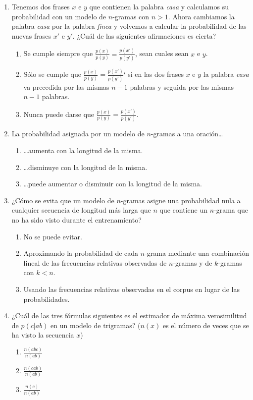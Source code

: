 \documentclass[12pt,a4paper]{article}
\begin{document}
\begin{enumerate}
\item Tenemos dos frases \(x\)
  e \(y\)
  que contienen la palabra \emph{casa} y calculamos su probabilidad
  con un modelo de \(n\)-gramas con \(n>1\).
  Ahora cambiamos la palabra \emph{casa} por la palabra \emph{finca} y
  volvemos a calcular la probabilidad de las nuevas frases \(x'\)
  e \(y'\). ¿Cuál de las siguientes afirmaciones es cierta?
  \begin{enumerate}
  \item Se cumple siempre que \(\frac{p(x)}{p(y)}=\frac{p(x')}{p(y')}\), sean cuales sean \(x\) e \(y\).
  \item Sólo se cumple que \(\frac{p(x)}{p(y)}=\frac{p(x')}{p(y')}\)`
    si en las dos frases \(x\)
    e \(y\)
    la palabra \emph{casa} va precedida por las mismas \(n-1\)
    palabras y seguida por las mismas \(n-1\) palabras.
  \item Nunca puede darse que \(\frac{p(x)}{p(y)}=\frac{p(x')}{p(y')}\).
  \end{enumerate}

\item La probabilidad asignada por un modelo de \(n\)-gramas a una oración\ldots
  \begin{enumerate}
  \item \ldots aumenta con la longitud de la misma.
  \item \ldots disminuye con la longitud de la misma.
  \item \ldots puede aumentar o disminuir con la longitud de la misma.
  \end{enumerate}

\item ¿Cómo se evita que un modelo de \(n\)-gramas asigne una probabilidad nula a cualquier secuencia de longitud más larga que \(n\) que contiene un \(n\)-grama que no ha sido visto durante el entrenamiento?
  \begin{enumerate}
  \item No se puede evitar.
  \item Aproximando la probabilidad de cada \(n\)-grama
    mediante una combinación lineal de las frecuencias relativas
    observadas de \(n\)-gramas y de \(k\)-gramas con \(k<n\).
  \item Usando las frecuencias relativas observadas en el corpus en
    lugar de las probabilidades.
  \end{enumerate}

\item ¿Cuál de las tres fórmulas siguientes es el estimador de máxima
  verosimilitud de \(p(c|ab)\)
  en un modelo de trigramas? (\(n(x)\)
  es el número de veces que se ha visto la secuencia \(x\))
  \begin{enumerate}
  \item \(\frac{n(abc)}{n(ab)}\)
  \item \(\frac{n(cab)}{n(ab)}\) 
  \item \(\frac{n(c)}{n(ab)}\)
  \end{enumerate}


\end{enumerate}
\end{document}
